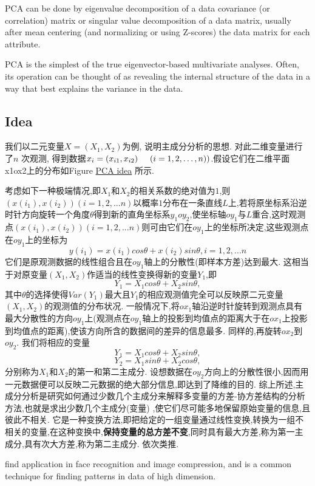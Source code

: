 \documentclass{article}
\begin{document}
PCA can be done by eigenvalue decomposition of a data covariance (or correlation) matrix or singular value decomposition of a data matrix, usually after mean centering (and normalizing or using Z-scores) the data matrix for each attribute.

PCA is the simplest of the true eigenvector-based multivariate analyses. Often, its operation can be thought of as revealing the internal structure of the data in a way that best explains the variance in the data.

\subsection{Idea}
我们以二元变量$X = (X_1, X_2)$为例, 说明主成分分析的思想. 对此二维变量进行了$n$ 次观测, 得到数据$x_i = (x_{i1},x_{i2}) \hspace{0.5cm} (i=1,2,\dots,n))$.假设它们在二维平面x1ox2上的分布如Figure
\href{http://upload.wikimedia.org/wikipedia/commons/thumb/1/15/GaussianScatterPCA.png/220px-GaussianScatterPCA.png}{PCA idea}
所示.

考虑如下一种极端情况,即$X_1$和$X_2$的相关系数的绝对值为$1$,则$(x(i_1),x(i_2))(i=1,2,...n)$以概率$1$分布在一条直线$L$上,若将原坐标系沿逆时针方向旋转一个角度$\theta $得到新的直角坐标系$y_1oy_2$,使坐标轴$oy_1$与$L$重合,这时观测点$(x(i_1),x(i_2))(i=1,2,...n)$则可由它们在$oy_1$上的坐标所决定,这些观测点在$oy_1$上的坐标为
$$ y(i_1)=x(i_1)cos\theta +x(i_2)sin\theta ,    i=1,2,...n $$
它们是原观测数据的线性组合且在$oy_1$轴上的分散性(即样本方差)达到最大. 这相当于对原变量$(X_1,X_2)$作适当的线性变换得新的变量$Y_1$,即
$$ Y_1=X_1cos\theta +X_2sin\theta , $$
其中$\theta $的选择使得$Var(Y_1)$最大且$Y_1$的相应观测值完全可以反映原二元变量$(X_1,X_2)$的观测值的分布状况. 一般情况下,将$ox_1$轴沿逆时针旋转到观测点具有最大分散性的方向$oy_1$上(观测点在$oy_1$轴上的投影到均值点的距离大于在$ox_1$上投影到均值点的距离),使该方向所含的数据间的差异的信息最多. 同样的,再旋转$ox_2$到$oy_2$. 我们将相应的变量
$$ Y_1=X_1cos\theta +X_2sin\theta , $$
$$ Y_2=X_1sin\theta +X_2cos\theta , $$
分别称为$X_1$和$X_2$的第一和第二主成分. 设想数据在$oy_2$方向上的分散性很小,因而用一元数据便可以反映二元数据的绝大部分信息,即达到了降维的目的.
综上所述,主成分分析是研究如何通过少数几个主成分来解释多变量的方差-协方差结构的分析方法,也就是求出少数几个主成分(变量) ,使它们尽可能多地保留原始变量的信息,且彼此不相关. 它是一种变换方法,即把给定的一组变量通过线性变换,转换为一组不相关的变量,在这种变换中,\textbf{保持变量的总方差不变},同时具有最大方差,称为第一主成分,具有次大方差,称为第二主成分. 依次类推.

find application in face recognition and image compression, and is a common technique for finding patterns in data of high dimension.
\end{document}
